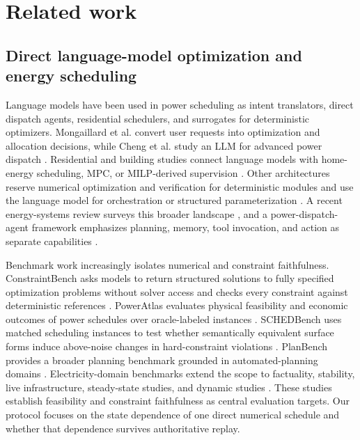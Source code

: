 \documentclass[11pt]{article}
\begin{document}
\section{Related work}
\label{sec:related}

\subsection{Direct language-model optimization and energy scheduling}

Language models have been used in power scheduling as intent translators, direct dispatch agents,
residential schedulers, and surrogates for deterministic optimizers. Mongaillard et al. convert
user requests into optimization and allocation decisions, while Cheng et al. study an LLM for
advanced power dispatch \cite{mongaillard2024power,cheng2025dispatch}. Residential and building
studies connect language models with home-energy scheduling, MPC, or MILP-derived supervision
\cite{michelon2025llmhems,elmakroum2026agentic,raghavan2026costoptimal,haghighi2026surrogate}.
Other architectures reserve numerical optimization and verification for deterministic modules and
use the language model for orchestration or structured parameterization
\cite{su2026microgrid,zhao2026carbonagent}. A recent energy-systems review surveys this broader
landscape \cite{zhang2026energysystems}, and a power-dispatch-agent framework emphasizes planning,
memory, tool invocation, and action as separate capabilities \cite{zhao2026dispatchagent}.

Benchmark work increasingly isolates numerical and constraint faithfulness. ConstraintBench asks
models to return structured solutions to fully specified optimization problems without solver
access and checks every constraint against deterministic references \cite{tso2026constraintbench}.
PowerAtlas evaluates physical feasibility and economic outcomes of power schedules over
oracle-labeled instances \cite{jiang2026poweratlas}. SCHEDBench uses matched scheduling instances
to test whether semantically equivalent surface forms induce above-noise changes in hard-constraint
violations \cite{sharma2026schedbench}. PlanBench provides a broader planning benchmark grounded in
automated-planning domains \cite{valmeekam2023planbench}. Electricity-domain benchmarks extend the
scope to factuality, stability, live infrastructure, steady-state studies, and dynamic studies
\cite{zhou2024elecbench,curcio2026energyagentbench,mylonas2026poweragentss,
zhang2026poweragentdyn}. These studies establish feasibility and constraint faithfulness as central
evaluation targets. Our protocol focuses on the state dependence of one direct numerical schedule
and whether that dependence survives authoritative replay.
\end{document}

